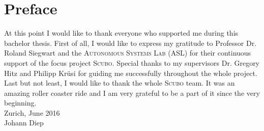\chapter*{Preface}

At this point I would like to thank everyone who supported me during this bachelor thesis. First of all, I would like to express my gratitude to Professor Dr. Roland Siegwart and the \textsc{Autonomous Systems Lab} (ASL) for their continuous support of the focus project \textsc{Scubo}. Special thanks to my supervisors Dr. Gregory Hitz and Philipp Kr\"usi for guiding me successfully throughout the whole project. Last but not least, I would like to thank the whole \textsc{Scubo} team. It was an amazing roller coaster ride and I am very grateful to be a part of it since the very beginning. \\

Zurich, June 2016 \\

Johann Diep    